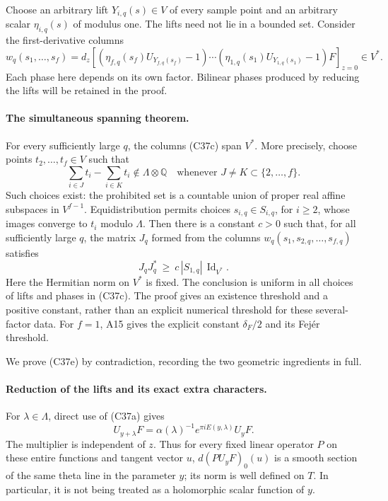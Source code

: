 \documentclass[11pt]{article}
\newcommand{\Q}{\mathbb Q}\newcommand{\C}{\mathbb C}\newcommand{\Z}{\mathbb Z}\newcommand{\R}{\mathbb R}\newcommand{\A}{\mathbb A}\newcommand{\OO}{\mathcal O}
\theoremstyle{definition}\newtheorem{definition}[theorem]{Definition}\newtheorem{remark}[theorem]{Remark}
\begin{document}
Choose an arbitrary lift $Y_{i,q}(s)\in V$ of every sample point and
an arbitrary scalar $\eta_{i,q}(s)$ of modulus one.  The lifts need
not lie in a bounded set.  Consider the first-derivative columns
\[
 w_q(s_1,\ldots,s_f)=
 d_z\left[
   (\eta_{f,q}(s_f)U_{Y_{f,q}(s_f)}-1)\cdots
   (\eta_{1,q}(s_1)U_{Y_{1,q}(s_1)}-1)F
       \right]_{z=0}\in V^*.
 \tag{C37c}
\]
Each phase here depends on its own factor.  Bilinear phases produced
by reducing the lifts will be retained in the proof.

\paragraph{The simultaneous spanning theorem.}
For every sufficiently large $q$, the columns (C37c) span $V^*$.
More precisely, choose points $t_2,\ldots,t_f\in V$ such that
\[
 \sum_{i\in J}t_i-\sum_{i\in K}t_i\notin\Lambda\otimes\Q
 \quad\text{whenever }J\ne K\subset\{2,\ldots,f\}.
 \tag{C37d}
\]
Such choices exist: the prohibited set is a countable union of
proper real affine subspaces in $V^{f-1}$.  Equidistribution permits
choices $s_{i,q}\in S_{i,q}$, for $i\ge2$, whose images converge to
$t_i$ modulo $\Lambda$.  Then there is a constant $c>0$ such that,
for all sufficiently large $q$, the matrix $J_q$ formed from the
columns $w_q(s_1,s_{2,q},\ldots,s_{f,q})$ satisfies
\[
 J_qJ_q^*\ \ge\ c\,|S_{1,q}|\,\operatorname{Id}_{V^*}.
 \tag{C37e}
\]
Here the Hermitian norm on $V^*$ is fixed.  The conclusion is
uniform in all choices of lifts and phases in (C37c).  The proof
gives an existence threshold and a positive constant, rather than
an explicit numerical threshold for these several-factor data.
For $f=1$, A15 gives the explicit constant $\delta_F/2$ and its
Fej\'er threshold.

We prove (C37e) by contradiction, recording the two geometric
ingredients in full.

\paragraph{Reduction of the lifts and its exact extra characters.}
For $\lambda\in\Lambda$, direct use of (C37a) gives
\[
 U_{y+\lambda}F
  =\alpha(\lambda)^{-1}e^{\pi iE(y,\lambda)}U_yF.
 \tag{C37f}
\]
The multiplier is independent of $z$.  Thus for every fixed linear
operator $P$ on these entire functions and tangent vector $u$,
$d(PU_yF)_0(u)$ is a smooth section of the same theta line in the
parameter $y$; its norm is well defined on $T$.  In particular,
it is not being treated as a holomorphic scalar function of $y$.
\end{document}
